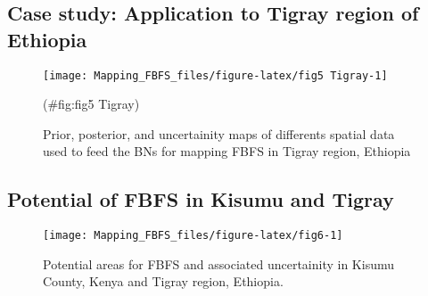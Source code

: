 \documentclass[12pt,oneside]{article}
\begin{document}
\hypertarget{case-study-application-to-tigray-region-of-ethiopia}{%
\subsection{Case study: Application to Tigray region of Ethiopia}\label{case-study-application-to-tigray-region-of-ethiopia}}

\begin{figure}[!htbp]

{\centering \texttt{[image: Mapping\_FBFS\_files/figure-latex/fig5 Tigray-1]} 

}

\caption{Prior, posterior, and uncertainity maps of differents spatial data used to feed the BNs for mapping FBFS in Tigray region, Ethiopia}(\#fig:fig5 Tigray)
\end{figure}

\hypertarget{potential-of-fbfs-in-kisumu-and-tigray}{%
\subsection{Potential of FBFS in Kisumu and Tigray}\label{potential-of-fbfs-in-kisumu-and-tigray}}

\begin{figure}[!htbp]

{\centering \texttt{[image: Mapping\_FBFS\_files/figure-latex/fig6-1]} 

}

\caption{Potential areas for FBFS and associated uncertainity in Kisumu County, Kenya and Tigray region, Ethiopia.}\label{fig:fig6}
\end{figure}

\begin{table}[t]

\caption{\label{tab:table3}Spatial coverage of FBFS in Kisumu County, Kenya and Tigray region, Ethiopia.}
\centering
{}
\end{table}
\end{document}
